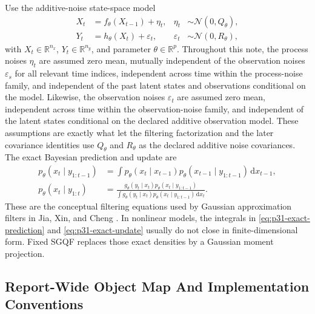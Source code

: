 \documentclass[11pt]{article}
\numberwithin{equation}{section}
\newcommand{\R}{\mathbb R}
\newcommand{\N}{\mathcal N}
\newcommand{\dd}{\,\mathrm d}
\begin{document}
Use the additive-noise state-space model
\begin{align}
  X_t &= f_\theta(X_{t-1})+\eta_t,
  &
  \eta_t&\sim\N(0,Q_\theta),
  \label{eq:p31-state-model}\\
  Y_t &= h_\theta(X_t)+\varepsilon_t,
  &
  \varepsilon_t&\sim\N(0,R_\theta),
  \label{eq:p31-observation-model}
\end{align}
with \(X_t\in\R^{n_x}\), \(Y_t\in\R^{n_y}\), and parameter \(\theta\in\R^p\).
Throughout this note, the process noises \(\eta_t\) are assumed zero mean,
mutually independent of the observation noises \(\varepsilon_s\) for all relevant
time indices, independent across time within the process-noise family, and
independent of the past latent states and observations conditional on the model.
Likewise, the observation noises \(\varepsilon_t\) are assumed zero mean,
independent across time within the observation-noise family, and independent of
the latent states conditional on the declared additive observation model.  These
assumptions are exactly what let the filtering factorization and the later
covariance identities use \(Q_\theta\) and \(R_\theta\) as the declared additive
noise covariances.
The exact Bayesian prediction and update are
\begin{align}
  p_\theta(x_t\mid y_{1:t-1})
  &=
  \int p_\theta(x_t\mid x_{t-1})
       p_\theta(x_{t-1}\mid y_{1:t-1})\dd x_{t-1},
  \label{eq:p31-exact-prediction}\\
  p_\theta(x_t\mid y_{1:t})
  &=
  \frac{
  g_\theta(y_t\mid x_t)
  p_\theta(x_t\mid y_{1:t-1})}
  {\int g_\theta(y_t\mid x_t)
  p_\theta(x_t\mid y_{1:t-1})\dd x_t}.
  \label{eq:p31-exact-update}
\end{align}
These are the conceptual filtering equations used by Gaussian approximation
filters in Jia, Xin, and Cheng \cite[Section 2]{jia2012sparsegrid}.  In
nonlinear models, the integrals in \eqref{eq:p31-exact-prediction} and
\eqref{eq:p31-exact-update} usually do not close in finite-dimensional form.
Fixed SGQF replaces those exact densities by a Gaussian moment projection.

\subsection{Report-Wide Object Map And Implementation Conventions}
\label{subsec:p32-object-map}
\end{document}
